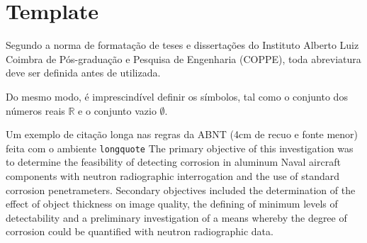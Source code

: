 \chapter{Template}

Segundo a norma de formata{\c c}\~ao de teses e disserta{\c c}\~oes do
Instituto Alberto Luiz Coimbra de P\'os-gradua{\c c}\~ao e Pesquisa de
Engenharia (COPPE), toda abreviatura deve ser definida antes de
utilizada.

Do mesmo modo, \'e imprescind\'ivel definir os s\'imbolos, tal como o
conjunto dos n\'umeros reais $\mathbb{R}$ e o conjunto vazio $\emptyset$.
\begin{longquote}
Um exemplo de citação longa nas regras da ABNT (4cm de recuo e fonte menor)
feita com o ambiente  \verb=longquote= The primary objective of this
investigation was to determine the feasibility of detecting corrosion in
aluminum Naval aircraft components with neutron radiographic interrogation
and the use of standard corrosion penetrameters. Secondary objectives
included the determination of the effect of object thickness on image quality,
the defining of minimum levels of detectability and a preliminary investigation
of a means whereby the degree of corrosion could be quantified with neutron
radiographic data. \cite{article-example}
\end{longquote}

